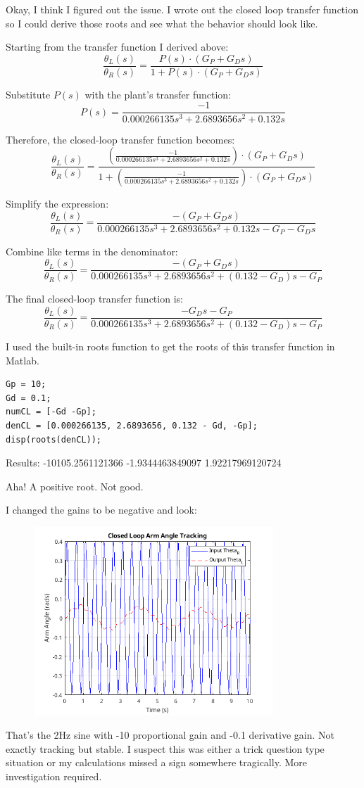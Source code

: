 \documentclass{article}
\begin{document}
Okay, I think I figured out the issue.
I wrote out the closed loop transfer function so I could derive those roots and see what the behavior should look like.

Starting from the transfer function I derived above:
\[
\frac{\theta_L(s)}{\theta_R(s)} = \frac{P(s) \cdot (G_P + G_D s)}{1 + P(s) \cdot (G_P + G_D s)}
\]

Substitute \(P(s)\) with the plant's transfer function:
\[
P(s) = \frac{-1}{0.000266135 s^3 + 2.6893656 s^2 + 0.132 s}
\]

Therefore, the closed-loop transfer function becomes:
\[
\frac{\theta_L(s)}{\theta_R(s)} = \frac{\left(\frac{-1}{0.000266135 s^3 + 2.6893656 s^2 + 0.132 s}\right) \cdot (G_P + G_D s)}{1 + \left(\frac{-1}{0.000266135 s^3 + 2.6893656 s^2 + 0.132 s}\right) \cdot (G_P + G_D s)}
\]

Simplify the expression:
\[
\frac{\theta_L(s)}{\theta_R(s)} = \frac{-(G_P + G_D s)}{0.000266135 s^3 + 2.6893656 s^2 + 0.132 s - G_P - G_D s}
\]

Combine like terms in the denominator:
\[
\frac{\theta_L(s)}{\theta_R(s)} = \frac{-(G_P + G_D s)}{0.000266135 s^3 + 2.6893656 s^2 + (0.132 - G_D) s - G_P}
\]

The final closed-loop transfer function is:
\[
\frac{\theta_L(s)}{\theta_R(s)} = \frac{-G_D s - G_P}{0.000266135 s^3 + 2.6893656 s^2 + (0.132 - G_D) s - G_P}
\]

I used the built-in roots function to get the roots of this transfer function in Matlab.

\begin{lstlisting}[style=matlabstyle]
Gp = 10;
Gd = 0.1;
numCL = [-Gd -Gp];
denCL = [0.000266135, 2.6893656, 0.132 - Gd, -Gp];
disp(roots(denCL));
\end{lstlisting}

Results:
-10105.2561121366
-1.9344463849097
1.92217969120724

Aha! A positive root. Not good.

I changed the gains to be negative and look:

\begin{figure}[H]
    \centering
    \includegraphics[width=0.8\textwidth]{negativeGain.png}
\end{figure}

That's the 2Hz sine with -10 proportional gain and -0.1 derivative gain.
Not exactly tracking but stable.
I suspect this was either a trick question type situation or my calculations missed a sign somewhere tragically.
More investigation required.
\end{document}
